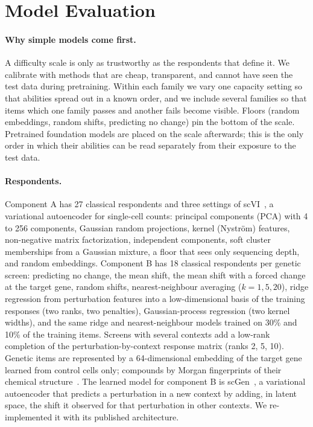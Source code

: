 \documentclass[11pt]{article}
\begin{document}
\section{Model Evaluation}
\label{sec:eval}

\paragraph{Why simple models come first.}
A difficulty scale is only as trustworthy as the respondents that define it. We
calibrate with methods that are cheap, transparent, and cannot have seen the test
data during pretraining. Within each family we vary one capacity setting so that
abilities spread out in a known order, and we include several families so that items
which one family passes and another fails become visible. Floors (random embeddings,
random shifts, predicting no change) pin the bottom of the scale. Pretrained
foundation models are placed on the scale afterwards; this is the only order in which
their abilities can be read separately from their exposure to the test data.

\paragraph{Respondents.}
Component A has 27 classical respondents and three settings of scVI~\cite{scvi}, a variational
autoencoder for single-cell counts: principal components (PCA) with 4 to 256
components, Gaussian random projections, kernel (Nystr\"om) features, non-negative
matrix factorization, independent components, soft cluster memberships from a
Gaussian mixture, a floor that sees only sequencing depth, and random embeddings.
Component B has 18 classical respondents per genetic screen: predicting no change,
the mean shift, the mean shift with a forced change at the target gene, random
shifts, nearest-neighbour averaging ($k=1,5,20$), ridge regression from perturbation
features into a low-dimensional basis of the training responses (two ranks, two
penalties), Gaussian-process regression (two kernel widths), and the same ridge and
nearest-neighbour models trained on 30\% and 10\% of the training items. Screens with
several contexts add a low-rank completion of the perturbation-by-context response
matrix (ranks 2, 5, 10). Genetic items are represented by a 64-dimensional embedding
of the target gene learned from control cells only; compounds by Morgan fingerprints
of their chemical structure~\cite{morgan}. The learned model for component B is scGen~\cite{scgen}, a
variational autoencoder that predicts a perturbation in a new context by adding, in
latent space, the shift it observed for that perturbation in other contexts. We
re-implemented it with its published architecture.
\end{document}
